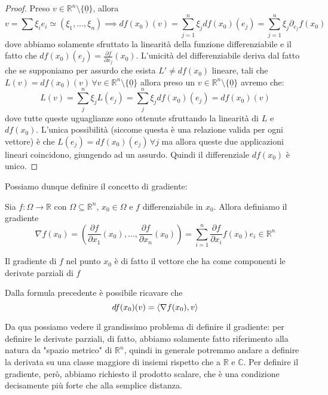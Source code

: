 \documentclass[openany]{book}
\begin{document}
\begin{proof}
Preso $v \in \mathbb{R}^n \setminus \{ \underline{0} \}$, allora 
$$
v = \sum \xi_i e_i \simeq (\xi_1, \ldots, \xi_n) \implies df(x_0)(v) = \sum_{j = 1}^n \xi_j df(x_0)(e_j) = \sum_{j=1}^n \xi_j \partial_{e_j} f(x_0)
$$
dove abbiamo solamente sfruttato la linearità della funzione differenziabile e il fatto che $df(x_0)(e_j) = \frac{\partial f}{\partial x_j}(x_0)$. L'unicità del differenziabile deriva dal fatto che se supponiamo per assurdo che esista $L' \neq df(x_0)$ lineare, tali che $L(v) = df(x_0)(v) \, \forall v \in \mathbb{R}^n \setminus \{ \underline{0} \}$ allora preso un $v \in \mathbb{R}^n \setminus \{ \underline{0} \}$ avremo che:
$$
L(v) = \sum_j^n \xi_j L(e_j) = \sum_j^n \xi_j df(x_0)(e_j) = df(x_0)(v)
$$
dove tutte queste uguaglianze sono ottenute sfruttando la linearità di $L$ e $df(x_0)$. L'unica possibilità (siccome questa è una relazione valida per ogni vettore) è che $L(e_j) = df(x_0)(e_j) \, \forall j$ ma allora queste due applicazioni lineari coincidono, giungendo ad un assurdo. Quindi il differenziale $df(x_0)$ è unico.
\end{proof}
\noindent Possiamo dunque definire il concetto di gradiente:
\begin{definition}
Sia $f: \Omega \to \mathbb{R}$ con $\Omega \subseteq \mathbb{R}^n$, $x_0 \in \Omega$ e $f$ differenziabile in $x_0$. Allora definiamo il gradiente $$\nabla{f(x_0)} = \left( \frac{\partial f}{\partial x_1}(x_0), \ldots, \frac{\partial f}{\partial x_n}(x_0) \right) = \sum_{i=1}^n \frac{\partial f}{\partial x_i}f(x_0)e_i \in \mathbb{R}^n$$
\end{definition}
\begin{remark}
Il gradiente di $f$ nel punto $x_0$ è di fatto il vettore che ha come componenti le derivate parziali di $f$
\end{remark}
\noindent Dalla formula precedente è possibile ricavare che
$$
df(x_0)(v) = \langle \nabla{f(x_0)}, v \rangle
$$
\begin{remark}
Da qua possiamo vedere il grandissimo problema di definire il gradiente: per definire le derivate parziali, di fatto, abbiamo solamente fatto riferimento alla natura da "spazio metrico" di $\mathbb{R}^n$, quindi in generale potremmo andare a definire la derivata su una classe maggiore di insiemi rispetto che a $\mathbb{R}$ e $\mathbb{C}$. Per definire il gradiente, però, abbiamo richiesto il prodotto scalare, che è una condizione decisamente più forte che alla semplice distanza.
\end{remark}
\end{document}
